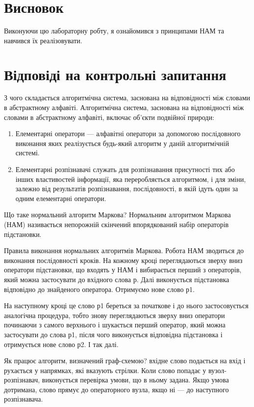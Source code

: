\documentclass[a4paper, 12pt, oneside]{extarticle}
\begin{document}
\section*{Висновок}

Виконуючи цю лабораторну робту, я ознайомився з принципами НАМ та навчився їх реалізовувати.

\section*{Відповіді на контрольні запитання}
\begin{itemize}
	\question З чого складається алгоритмічна система, заснована на відповідності
між словами в абстрактному алфавіті.
	\answer Алгоритмічна система, заснована на відповідності між словами в
		абстрактному алфавіті, включає об’єкти подвійної природи:
		\begin{enumerate}
				\item	Елементарні оператори --- алфавітні оператори за допомогою
					послідовного виконання яких реалізується будь-який алгоритм у даній
					алгоритмічній системі.
				\item	Елементарні розпізнавачі служать для розпізнавання присутності тих
					або інших властивостей інформації, яка переробляється алгоритмом, і для
					зміни, залежно від результатів розпізнавання, послідовності, в якій ідуть
					один за одним елементарні оператори.
		\end{enumerate}

	\question Що таке нормальний алгоритм Маркова?
	\answer Нормальним алгоритмом Маркова (НАМ) називається непорожній
скінчений впорядкований набір операторів підстановки.

	\question Правила виконання нормальних алгоритмів Маркова.
	\answer Робота НАМ зводиться до виконання послідовності кроків.
		На кожному кроці переглядаються зверху вниз оператори підстановки,
		що входять у НАМ і вибирається перший з операторів, який можна застосувати до вхідного слова р.
		Далі виконується підстановка відповідно до знайденого оператора. Отримуємо нове слово р1.

		На наступному кроці це слово р1 береться за початкове і до нього
		застосовується аналогічна процедура, тобто знову переглядаються зверху
		вниз оператори починаючи з самого верхнього і шукається перший
		оператор, який можна застосувати до слова р1, після чого виконується
		відповідна підстановка і отримується нове слово р2. І так далі.

	\question Як працює алгоритм, визначений граф-схемою?
	\answer вхідне слово подається на вхід і рухається у напрямках, які вказують стрілки. Коли слово попадає у вузол-розпізнавач, виконується перевірка умови, що в ньому задана. Якщо умова дотримана, слово прямує до операторного вузла, якщо ні — до наступного розпізнавача.


\end{itemize}
\end{document}
